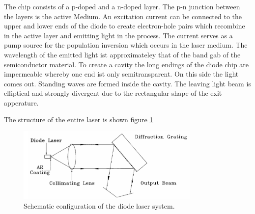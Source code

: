 The chip consists of a p-doped and a n-doped layer. The p-n junction between the layers is the active Medium.
An excitation current can be connected to the upper and lower ends of the diode to create electron-hole pairs which recombine in the active layer and
emitting light in the process. The current serves as a pump source for the population inversion which occurs in the laser medium.
The wavelength of the emitted light ist approximateley that of the band gab of the semiconductor material.
To create a cavity the long endings of the diode chip are impermeable whereby one end ist only semitransparent.
On this side the light comes out.
Standing waves are formed inside the cavity. The leaving light beam is elliptical and strongly divergent due to the  rectangular shape of the
exit apperature.

The structure of the entire laser is shown figure \ref{fig:configuration}

\begin{figure}[H]
    \centering
    \includegraphics[width=0.8\textwidth]{content/graphics/configuration.jpg}
    \caption{Schematic configuration of the diode laser system.} %
    \label{fig:configuration}
\end{figure}